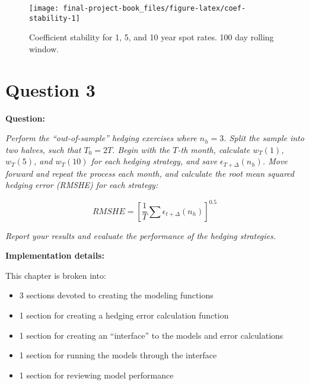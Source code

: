 \documentclass[openany]{book}
\providecommand{\tightlist}{%
  \setlength{\itemsep}{0pt}\setlength{\parskip}{0pt}}
\theoremstyle{definition}
\theoremstyle{definition}
\theoremstyle{definition}
\theoremstyle{remark}
\begin{document}
\small

\begin{figure}[H]

{\centering \texttt{[image: final-project-book\_files/figure-latex/coef-stability-1]} 

}

\caption{Coefficient stability for 1, 5, and 10 year spot rates. 100 day rolling window.}\label{fig:coef-stability}
\end{figure}

\normalsize

\small

\normalsize

\hypertarget{q3}{%
\chapter{Question 3}\label{q3}}

\textbf{Question:}

\emph{Perform the ``out-of-sample'' hedging exercises where \(n_h = 3\).
Split the sample into two halves, such that \(T_0 = 2T\). Begin with the
\(T\)-th month, calculate \(w_T(1)\), \(w_T(5)\), and \(w_T(10)\) for
each hedging strategy, and save \(\epsilon_{T+\Delta}(n_h)\). Move
forward and repeat the process each month, and calculate the root mean
squared hedging error (RMSHE) for each strategy:}

\[ RMSHE = [\frac{1}{T} \sum{\epsilon_{t+\Delta}(n_h)}]^{0.5} \]

\emph{Report your results and evaluate the performance of the hedging
strategies.}

\textbf{Implementation details:}

This chapter is broken into:

\begin{itemize}
\tightlist
\item
  3 sections devoted to creating the modeling functions
\item
  1 section for creating a hedging error calculation function
\item
  1 section for creating an ``interface'' to the models and error
  calculations
\item
  1 section for running the models through the interface
\item
  1 section for reviewing model performance
\end{itemize}

\small

\normalsize
\end{document}
